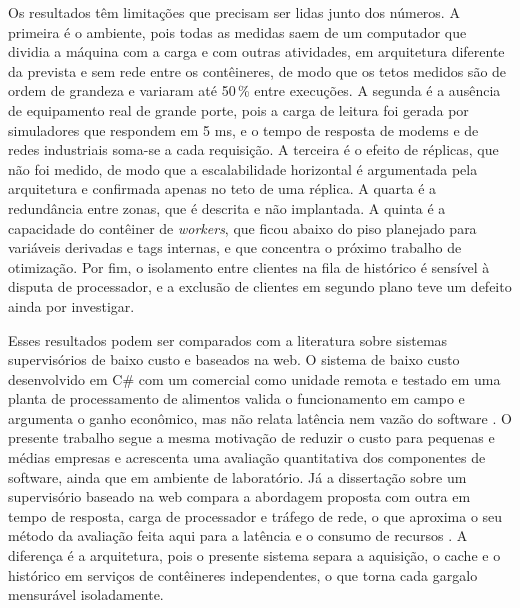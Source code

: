 \par Os resultados têm limitações que precisam ser lidas junto dos números. A primeira é o ambiente, pois todas as medidas saem de um computador que dividia a máquina com a carga e com outras atividades, em arquitetura diferente da prevista e sem rede entre os contêineres, de modo que os tetos medidos são de ordem de grandeza e variaram até 50\,\% entre execuções. A segunda é a ausência de equipamento real de grande porte, pois a carga de leitura foi gerada por simuladores que respondem em 5 ms, e o tempo de resposta de modems e de redes industriais soma-se a cada requisição. A terceira é o efeito de réplicas, que não foi medido, de modo que a escalabilidade horizontal é argumentada pela arquitetura e confirmada apenas no teto de uma réplica. A quarta é a redundância entre zonas, que é descrita e não implantada. A quinta é a capacidade do contêiner de \emph{workers}, que ficou abaixo do piso planejado para variáveis derivadas e tags internas, e que concentra o próximo trabalho de otimização. Por fim, o isolamento entre clientes na fila de histórico é sensível à disputa de processador, e a exclusão de clientes em segundo plano teve um defeito ainda por investigar.

\par Esses resultados podem ser comparados com a literatura sobre sistemas supervisórios de baixo custo e baseados na web. O sistema  de baixo custo desenvolvido em C\# com um  comercial como unidade remota e testado em uma planta de processamento de alimentos valida o funcionamento em campo e argumenta o ganho econômico, mas não relata latência nem vazão do software \cite{PHUYAL2020_COST_EFFICIENT_SCADA}. O presente trabalho segue a mesma motivação de reduzir o custo para pequenas e médias empresas e acrescenta uma avaliação quantitativa dos componentes de software, ainda que em ambiente de laboratório. Já a dissertação sobre um supervisório baseado na web compara a abordagem proposta com outra em tempo de resposta, carga de processador e tráfego de rede, o que aproxima o seu método da avaliação feita aqui para a latência e o consumo de recursos \cite{AHMED2011_EFFICIENT_WEB_SCADA}. A diferença é a arquitetura, pois o presente sistema separa a aquisição, o cache e o histórico em serviços de contêineres independentes, o que torna cada gargalo mensurável isoladamente.

